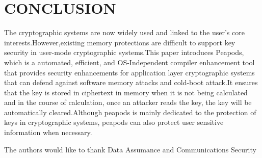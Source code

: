 
\section{CONCLUSION}
The cryptographic systems are now widely used and linked to the user's core interests.However,existing memory protections are difficult to support key security in user-mode cryptographic systems.This paper introduces Peapods, which is a automated, efficient, and OS-Independent compiler enhancement tool that provides security enhancements for application layer cryptographic systems that can defend against software memory attacks and cold-boot attack.It ensures that the key is stored in ciphertext in memory when it is not being calculated and in the course of calculation, once an attacker reads the key, the key will be automatically cleared.Although peapods is mainly dedicated to the protection of keys in cryptographic systems, peapods can also protect user sensitive information when necessary.

\begin{acks}

The authors would like to thank Data Assumance and Communications Security


\end{acks}


